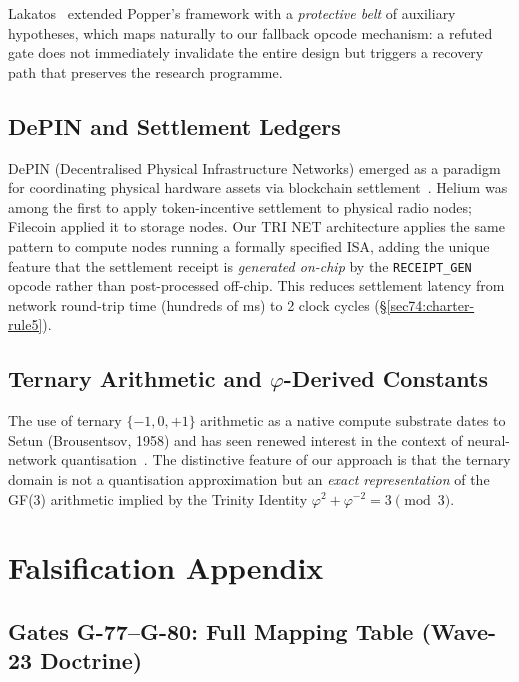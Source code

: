 Lakatos~\cite{lakatos1970methodology} extended Popper's framework with a
\emph{protective belt} of auxiliary hypotheses, which maps naturally
to our fallback opcode mechanism: a refuted gate does not immediately
invalidate the entire design but triggers a recovery path that
preserves the research programme.

\subsection{DePIN and Settlement Ledgers}
\label{sec74:related-depin}

DePIN (Decentralised Physical Infrastructure Networks) emerged as a
paradigm for coordinating physical hardware assets via blockchain
settlement~\cite{peaq2023depin}.  Helium was among the first to apply
token-incentive settlement to physical radio nodes; Filecoin applied it
to storage nodes.  Our TRI NET architecture applies the same pattern to
compute nodes running a formally specified ISA, adding the unique feature
that the settlement receipt is \emph{generated on-chip} by the
\texttt{RECEIPT\_GEN} opcode rather than post-processed off-chip.  This
reduces settlement latency from network round-trip time (hundreds of ms)
to 2 clock cycles (\S\ref{sec74:charter-rule5}).

\subsection{Ternary Arithmetic and $\varphi$-Derived Constants}
\label{sec74:related-ternary}

The use of ternary $\{-1,0,+1\}$ arithmetic as a native compute substrate
dates to Setun (Brousentsov, 1958) and has seen renewed interest in the
context of neural-network quantisation~\cite{wang_bitnet_2023}.  The
distinctive feature of our approach is that the ternary domain is not
a quantisation approximation but an \emph{exact representation} of the
GF(3) arithmetic implied by the Trinity Identity
$\varphi^{2}+\varphi^{-2}=3 \pmod{3}$.

\section{Falsification Appendix}
\label{sec74:falsification-appendix}

\subsection{Gates G-77--G-80: Full Mapping Table (Wave-23 Doctrine)}
\label{sec74:g77-g80}

